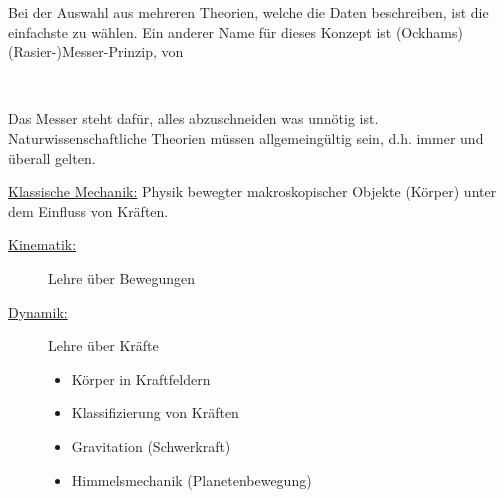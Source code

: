 \begin{flushleft}
	
	Bei der Auswahl aus mehreren Theorien, welche die Daten beschreiben, ist die einfachste zu wählen. Ein anderer Name für dieses Konzept ist (Ockhams) (Rasier-)Messer-Prinzip, von
	
	
	\begin{flalign*}
	\begin{rcases}
	 \\
	\end{rcases} 
	\end{flalign*}
	
	\hfill \break Das Messer steht dafür, alles abzuschneiden was unnötig ist. Naturwissenschaftliche Theorien müssen allgemeingültig sein, d.h. immer und überall gelten.\\ \hfill \break
	
	\underline{Klassische Mechanik:} Physik bewegter makroskopischer Objekte (Körper) unter dem Einfluss von Kräften.\\ \hfill \break
	
	\begin{description}
		
		\item[\underline{Kinematik:}] Lehre über Bewegungen
		
		\item[\underline{Dynamik:}] Lehre über Kräfte
		
		\begin{itemize}
			
			\item Körper in Kraftfeldern
			
			\item Klassifizierung von Kräften
			
			\item Gravitation (Schwerkraft)
			
			\item Himmelsmechanik (Planetenbewegung)
			
		\end{itemize}
		
	\end{description}
	
\end{flushleft}	
